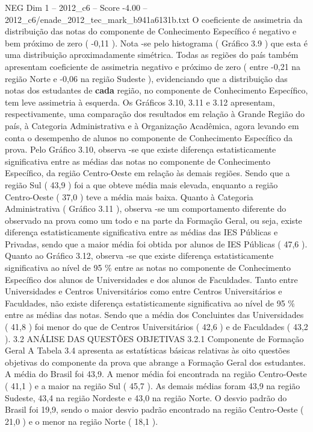 \begin{textsample}{NEG Dim 1 – 2012\_c6 – Score -4.00 – 2012\_c6/enade\_2012\_tec\_mark\_b941a6131b.txt}
O coeficiente de assimetria da distribuição das notas do componente de Conhecimento Específico é negativo e bem próximo de zero ( -0,11 ).
Nota -se pelo histograma ( Gráfico 3.9 ) que esta é uma distribuição aproximadamente simétrica.
Todas as regiões do país também apresentam coeficiente de assimetria negativo e próximo de zero ( entre -0,21 na região Norte e -0,06 na região Sudeste ), evidenciando que a distribuição das notas dos estudantes de \textbf{cada} região, no componente de Conhecimento Específico, tem leve assimetria à esquerda.
Os Gráficos 3.10, 3.11 e 3.12 apresentam, respectivamente, uma comparação dos resultados em relação à Grande Região do país, à Categoria Administrativa e à Organização Acadêmica, agora levando em conta o desempenho de alunos no componente de Conhecimento Específico da prova.
Pelo Gráfico 3.10, observa -se que existe diferença estatisticamente significativa entre as médias das notas no componente de Conhecimento Específico, da região Centro-Oeste em relação às demais regiões.
Sendo que a região Sul ( 43,9 ) foi a que obteve média mais elevada, enquanto a região Centro-Oeste ( 37,0 ) teve a média mais baixa.
Quanto à Categoria Administrativa ( Gráfico 3.11 ), observa -se um comportamento diferente do observado na prova como um todo e na parte da Formação Geral, ou seja, existe diferença estatisticamente significativa entre as médias das IES Públicas e Privadas, sendo que a maior média foi obtida por alunos de IES Públicas ( 47,6 ).
Quanto ao Gráfico 3.12, observa -se que existe diferença estatisticamente significativa ao nível de 95 \% entre as notas no componente de Conhecimento Específico dos alunos de Universidades e dos alunos de Faculdades.
Tanto entre Universidades e Centros Universitários como entre Centros Universitários e Faculdades, não existe diferença estatisticamente significativa ao nível de 95 \% entre as médias das notas.
Sendo que a média dos Concluintes das Universidades ( 41,8 ) foi menor do que de Centros Universitários ( 42,6 ) e de Faculdades ( 43,2 ). 3.2 ANÁLISE DAS QUESTÕES OBJETIVAS 3.2.1 Componente de Formação Geral A Tabela 3.4 apresenta as estatísticas básicas relativas às oito questões objetivas do componente da prova que abrange a Formação Geral dos estudantes.
A média do Brasil foi 43,9.
A menor média foi encontrada na região Centro-Oeste ( 41,1 ) e a maior na região Sul ( 45,7 ).
As demais médias foram 43,9 na região Sudeste, 43,4 na região Nordeste e 43,0 na região Norte.
O desvio padrão do Brasil foi 19,9, sendo o maior desvio padrão encontrado na região Centro-Oeste ( 21,0 ) e o menor na região Norte ( 18,1 ).

\end{textsample}
